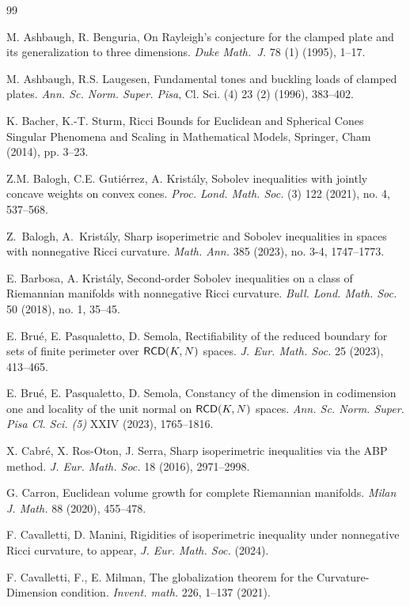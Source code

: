 \documentclass[11pt, reqno]{amsart}
\numberwithin{equation}{section}
\begin{document}
\begin{thebibliography}{99}
		
		
		
		 M. Ashbaugh, R. Benguria, On Rayleigh's conjecture for the clamped plate and its generalization to three dimensions. \textit{Duke Math.\ J.} 78 (1) (1995), 1--17. 
		
		M. Ashbaugh, R.S. Laugesen, Fundamental tones and buckling loads of clamped plates. \textit{Ann. Sc. Norm. Super. Pisa}, Cl. Sci. (4) 23 (2) (1996), 383--402. 
		
		 K. Bacher, K.-T. Sturm,  Ricci Bounds for Euclidean and Spherical Cones Singular Phenomena and
		Scaling in Mathematical Models, Springer, Cham (2014), pp. 3--23. 
		
		 Z.M. Balogh, C.E. Gutiérrez, A. Kristály,  Sobolev inequalities with jointly concave weights on convex cones. \textit{Proc. Lond. Math. Soc.} (3) 122 (2021), no. 4, 537--568.
		
		
		 Z.\ Balogh,   A.\ Krist\'{a}ly,  Sharp isoperimetric and Sobolev inequalities in spaces with nonnegative Ricci curvature. \textit{Math. Ann.}  385 (2023), no. 3-4, 1747--1773. 
		
	 	E. Barbosa, A. Kristály, 
		Second-order Sobolev inequalities on a class of Riemannian manifolds with nonnegative Ricci curvature. 
		\textit{Bull. Lond. Math. Soc.} 50 (2018), no. 1, 35--45. 
		
			E. Bru\'e, E. Pasqualetto, D. Semola,  Rectifiability of the reduced boundary for sets of finite
		perimeter over ${\sf RCD}(K, N)$  spaces. \textit{J. Eur. Math. Soc.} 25 (2023), 413--465. 
		
			E. Bru\'e, E. Pasqualetto, D. Semola, Constancy of the dimension in codimension one and locality of the unit normal on ${\sf RCD}(K,N)$ spaces. \textit{Ann. Sc. Norm. Super. Pisa Cl. Sci. (5)} XXIV (2023), 1765--1816.
		
		 X. Cabré, X. Ros-Oton, J. Serra, Sharp isoperimetric inequalities via the ABP method. \textit{J. Eur. Math. Soc.} 18 (2016), 2971--2998.  
		
		 G. 
		Carron,  Euclidean volume growth for complete Riemannian manifolds. \textit{Milan J. Math.} 88 (2020), 455--478.  
		
		 F. Cavalletti, D. Manini, Rigidities of isoperimetric inequality under nonnegative Ricci curvature,
		to appear, \textit{J. Eur. Math. Soc.} (2024).
  
   F. Cavalletti, F., E. Milman, The globalization theorem for the Curvature-Dimension condition. \textit{Invent. math.} 226, 1–137 (2021).  
  

\end{thebibliography}
\end{document}
